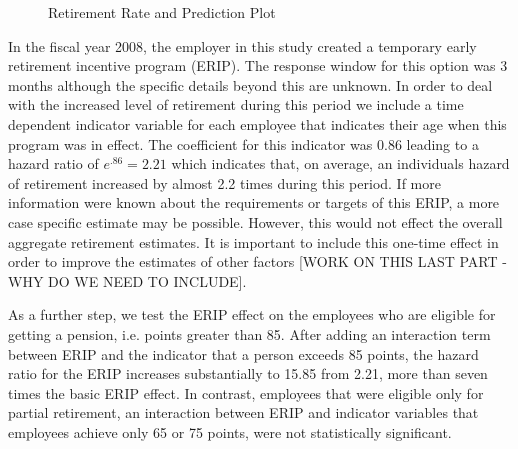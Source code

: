 \documentclass[12pt,letterpaper]{article}
\begin{document}
\begin{figure}[h!]
	\centering
	\caption{Retirement Rate and Prediction Plot}
	\label{fig:rerate}
\end{figure}

In the fiscal year 2008, the employer in this study created a temporary early retirement incentive program (ERIP). The response window for this option was 3 months although the specific details beyond this are unknown. In order to deal with the increased level of retirement during this period we include a time dependent indicator variable for each employee that indicates their age when this program was in effect.  The coefficient for this indicator was 0.86 leading to a hazard ratio of $e^{.86} = 2.21$ which indicates that, on average, an individuals hazard of retirement increased by almost 2.2 times during this period.  If more information were known about the requirements or targets of this ERIP, a more case specific estimate may be possible.  However, this would not effect the overall aggregate retirement estimates.  It is important to include this one-time effect in order to improve the estimates of other factors [WORK ON THIS LAST PART - WHY DO WE NEED TO INCLUDE].

As a further step, we test the ERIP effect on the employees who are eligible for getting a pension, i.e. points greater than 85.  After adding an interaction term between ERIP and the indicator that a person exceeds 85 points, the hazard ratio for the ERIP increases substantially to 15.85 from 2.21, more than seven times the basic ERIP effect. In contrast, employees that were eligible only for partial retirement, an interaction between ERIP and indicator variables that employees achieve only 65 or 75 points, were not statistically significant.
\end{document}
